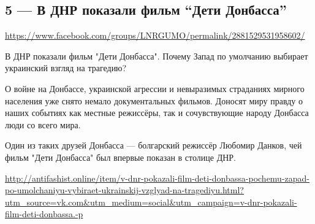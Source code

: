  
 
  
\clearpage
\subsection{5 --- В ДНР показали фильм ``Дети Донбасса''}
\url{https://www.facebook.com/groups/LNRGUMO/permalink/2881529531958602/}
  
В ДНР показали фильм "Дети Донбасса". Почему Запад по умолчанию выбирает
украинский взгляд на трагедию?

О войне на Донбассе, украинской агрессии и невыразимых страданиях мирного
населения уже снято немало документальных фильмов. Доносят миру правду о наших
событиях как местные режиссёры, так и сочувствующие народу Донбасса люди со
всего мира.

Один из таких друзей Донбасса --- болгарский режиссёр Любомир Данков, чей фильм
"Дети Донбасса" был впервые показан в столице ДНР.

\url{http://antifashist.online/item/v-dnr-pokazali-film-deti-donbassa-pochemu-zapad-po-umolchaniyu-vybiraet-ukrainskij-vzglyad-na-tragediyu.html?utm_source=vk.com&utm_medium=social&utm_campaign=v-dnr-pokazali-film-deti-donbassa.-p}
